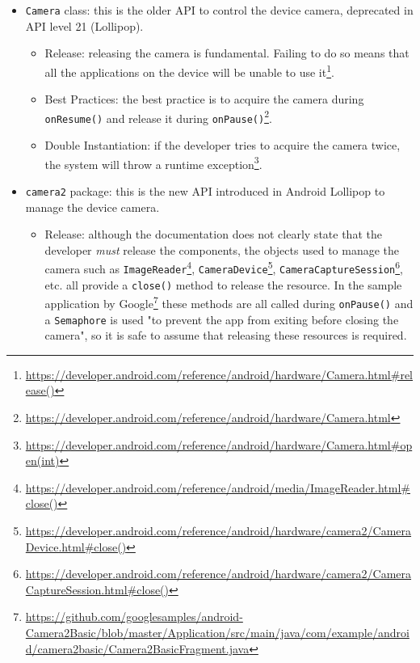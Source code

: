 \documentclass[11pt,a4paper,notitlepage]{article}
\begin{document}
\begin{itemize}
\begin{itemize}
			\item \texttt{Camera} class: this is the older API to control the device camera, deprecated in API level 21 (Lollipop).
			\begin{itemize}
				\item Release: releasing the camera is fundamental. Failing to do so means that all the applications on the device will be unable to use it\footnote{\url{https://developer.android.com/reference/android/hardware/Camera.html\#release()}}.
				\item Best Practices: the best practice is to acquire the camera during \texttt{onResume()} and release it during \texttt{onPause()}\footnote{\url{https://developer.android.com/reference/android/hardware/Camera.html}}.
				\item Double Instantiation: if the developer tries to acquire the camera twice, the system will throw a runtime exception\footnote{\url{https://developer.android.com/reference/android/hardware/Camera.html\#open(int)}}.
			\end{itemize}
			\item \texttt{camera2} package: this is the new API introduced in Android Lollipop to manage the device camera.
			\begin{itemize}
				\item Release: although the documentation does not clearly state that the developer \textit{must} release the components, the objects used to manage the camera such as \texttt{ImageReader}\footnote{\url{https://developer.android.com/reference/android/media/ImageReader.html\#close()}}, \texttt{CameraDevice}\footnote{\url{https://developer.android.com/reference/android/hardware/camera2/CameraDevice.html\#close()}}, \texttt{CameraCaptureSession}\footnote{\url{https://developer.android.com/reference/android/hardware/camera2/CameraCaptureSession.html\#close()}}, etc. all provide a \texttt{close()} method to release the resource. In the sample application by Google\footnote{\url{https://github.com/googlesamples/android-Camera2Basic/blob/master/Application/src/main/java/com/example/android/camera2basic/Camera2BasicFragment.java}} these methods are all called during \texttt{onPause()} and a \texttt{Semaphore} is used "to prevent the app from exiting before closing the camera", so it is safe to assume that releasing these resources is required.

\end{itemize}
\end{itemize}
\end{itemize}
\end{document}
